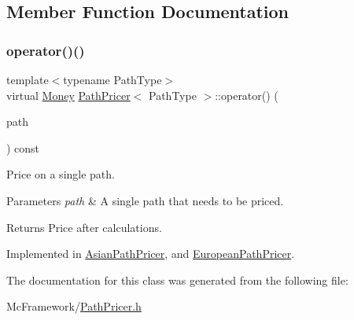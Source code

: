 \subsection{Member Function Documentation}
\hypertarget{class_path_pricer_a14b2a03f259bb56a24a66c9b95bdcf67}{}\label{class_path_pricer_a14b2a03f259bb56a24a66c9b95bdcf67} 
\subsubsection{\texorpdfstring{operator()()}{operator()()}}
{\footnotesize\ttfamily template$<$typename Path\+Type$>$ \\
virtual \hyperlink{_name_def_8h_a5a9d48c16a694e9a2d9f1eca730dc8c5}{Money} \hyperlink{class_path_pricer}{Path\+Pricer}$<$ Path\+Type $>$\+::operator() (\begin{DoxyParamCaption}\item[{const \hyperlink{class_path}{Path}$<$ Path\+Type $>$ \&}]{path }\end{DoxyParamCaption}) const\hspace{0.3cm}{\ttfamily [pure virtual]}}



Price on a single path. 


\begin{DoxyParams}{Parameters}
{\em path} & A single path that needs to be priced. \\
\hline
\end{DoxyParams}
\begin{DoxyReturn}{Returns}
Price after calculations. 
\end{DoxyReturn}


Implemented in \hyperlink{class_asian_path_pricer_a929e8a33447f977bfc947e1d5344e353}{Asian\+Path\+Pricer}, and \hyperlink{class_european_path_pricer_a879d161eeff532f1f3e2fc5224b3361b}{European\+Path\+Pricer}.



The documentation for this class was generated from the following file\+:\begin{DoxyCompactItemize}
\item 
Mc\+Framework/\hyperlink{_path_pricer_8h}{Path\+Pricer.\+h}\end{DoxyCompactItemize}

